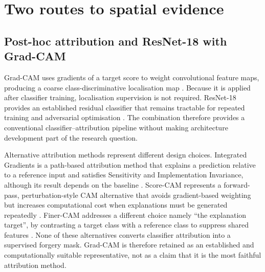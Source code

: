


\section{Two routes to spatial evidence}
\label{sec:lr-where}

\subsection{Post-hoc attribution and ResNet-18 with Grad-CAM}

Grad-CAM uses gradients of a target score to weight convolutional feature maps, producing a coarse class-discriminative localisation map \citep{selvaraju2017gradcam}. Because it is applied after classifier training, localisation supervision is not required. ResNet-18 provides an established residual classifier that remains tractable for repeated training and adversarial optimisation \citep{he2016resnet}. The combination therefore provides a conventional classifier--attribution pipeline without making architecture development part of the research question.

Alternative attribution methods represent different design choices. Integrated Gradients is a path-based attribution method that explains a prediction relative to a reference input and satisfies Sensitivity and Implementation Invariance, although its result depends on the baseline \citep{sundararajan2017axiomatic}. Score-CAM represents a forward-pass, perturbation-style CAM alternative that avoids gradient-based weighting but increases computational cost when explanations must be generated repeatedly \citep{wang2020scorecam}. Finer-CAM addresses a different choice namely ``the explanation target'', by contrasting a target class with a reference class to suppress shared features \citep{zhang2025finercam}. None of these alternatives converts classifier attribution into a supervised forgery mask. Grad-CAM is therefore retained as an established and computationally suitable representative, not as a claim that it is the most faithful attribution method.

